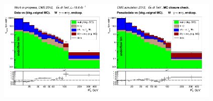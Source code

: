 \begin{figure}[htb]
  \begin{center}
   \includegraphics[width=0.48\textwidth]{../figs/figs_v11/ELECTRON_WGamma/PrepareYields/c_DATAvsBkgPlusSigMCc_ELECTRON_WGamma_TEMPL_CHISO_UNblind__Endcap__phoEt.png}\includegraphics[width=0.48\textwidth]{../figs/figs_v11/ELECTRON_WGamma/PrepareYields/c_DATAvsBkgPlusSigMCc_ELECTRON_WGamma_TEMPL_CHISO_UNblind_MCclosure__Endcap__phoEt_MCclosure.png}\\

\end{center}
\end{figure}
